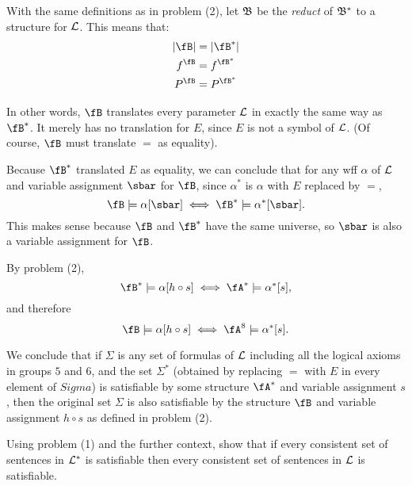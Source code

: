 \begin{problem}
  With the same definitions as in problem (2),
  let $\mathfrak{B}$ be the \emph{reduct} of $\mathfrak{B}^*$ to a structure
  for $\mathcal{L}$. This means that:
  \begin{align*}
    \abs{\fB} &= \abs{\fB^*} \\
    f^{\fB} &= f^{\fB^*} \\
    P^\fB &= P^{\fB^*}
  \end{align*}

  \step
  In other words, $\fB$ translates every parameter $\mathcal{L}$
  in exactly the same way as $\fB^*$.
  It merely has no translation for $E$, since $E$ is not a symbol of
  $\mathcal{L}$. (Of course, $\fB$ must translate $=$ as equality).

  \step
  Because $\fB^*$ translated $E$ as equality, we can conclude that
  for any wff $\alpha$ of $\mathcal{L}$ and variable assignment $\sbar$
  for $\fB$, since $\alpha^*$ is $\alpha$ with $E$ replaced by $=$,
  \[ \fB \models \alpha [\sbar ] \Iff \fB^* \models \alpha^*[\sbar]. \]
  This makes sense because $\fB$ and $\fB^*$ have the same universe,
  so $\sbar$ is also a variable assignment for $\fB$.

  \step
  By problem (2),
  \[ \fB^* \models \alpha [h \circ s] \Iff \fA^* \models \alpha^* [s], \]
  and therefore
  \[ \fB \models \alpha [h \circ s] \Iff \fA^8 \models \alpha^* [s]. \]

  \step
  We conclude that if $\Sigma$ is any set of formulas of $\mathcal{L}$
  including all the logical axioms in groups $5$ and $6$,
  and the set $\Sigma^*$ (obtained by replacing $=$ with $E$
  in every element of $Sigma$) is satisfiable
  by some structure $\fA^*$ and variable assignment $s$,
  then the original set $\Sigma$ is also satisfiable by the structure
  $\fB$ and variable assignment $h \circ s$ as defined in problem (2).

  \step
  Using problem (1) and the further context, show that if every consistent
  set of sentences in $\mathcal{L}^*$ is satisfiable then every consistent set of
  sentences in $\mathcal{L}$ is satisfiable.
  \begin{Answer}

  \end{Answer}
\end{problem}
